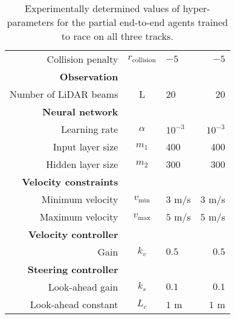 \begin{table}[htb!]
\begin{tabularx}{0.95\textwidth}{RCLN}
    Collision penalty                       & $r_{\text{collision}}$    & $-5$              & $-5$ \\
    \textbf{Observation}                    &                           &                   & \\
    Number of LiDAR beams                   & L                         & 20                & 20 \\
    \textbf{Neural network}                 &                           &                   &  \\
    Learning rate                           & $\alpha$                  & $10^{-3}$         &  $10^{-3}$ \\
    Input layer size                        & $m_1$                     & 400               & 400  \\
    Hidden layer size                       & $m_2$                     & 300               & 300  \\
    \textbf{Velocity constraints}           &                           &                   & \\
    Minimum velocity                        & $v_{\text{min}}$          & $3$ m/s           & $3$ m/s  \\
    Maximum velocity                        & $v_{\text{max}}$          & $5$ m/s           & $5$ m/s  \\
    \textbf{Velocity controller}            &                           &                   & \\
    Gain                                    & $k_{v}$                   & $0.5$             & $0.5$   \\
    \textbf{Steering controller}            &                           &                   & \\
    Look-ahead gain                         & $k_{s}$                   & $0.1$             & $0.1$  \\
    Look-ahead constant                     & $L_c$                     & $1$ m             & $1$ m \\
    \hline
\end{tabularx}
\caption[Values of hyper-parameters for the partial end-to-end racing algorithm]{Experimentally determined values of hyper-parameters for the partial end-to-end agents trained to race on all three tracks.}
\label{tab:pete_values}
\end{table}
